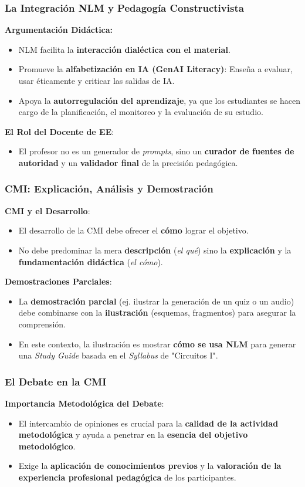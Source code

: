\documentclass[aspectratio=43]{beamer}
\begin{document}
\begin{frame}
\frametitle{ La Integración NLM y Pedagogía Constructivista}

\textbf{Argumentación Didáctica:}
\begin{itemize}
    \item NLM facilita la \textbf{interacción dialéctica con el material}.
    \item Promueve la \textbf{alfabetización en IA (GenAI Literacy)}: Enseña a evaluar, usar éticamente y criticar las salidas de IA.
    \item Apoya la \textbf{autorregulación del aprendizaje}, ya que los estudiantes se hacen cargo de la planificación, el monitoreo y la evaluación de su estudio.
\end{itemize}
\vfill
\textbf{El Rol del Docente de EE}:
\begin{itemize}
    \item El profesor no es un generador de \textit{prompts}, sino un \textbf{curador de fuentes de autoridad} y un \textbf{validador final} de la precisión pedagógica.
\end{itemize}
\end{frame}

\begin{frame}
\frametitle{ CMI: Explicación, Análisis y Demostración}

\textbf{CMI y el Desarrollo}:
\begin{itemize}
    \item El desarrollo de la CMI debe ofrecer el \textbf{cómo} lograr el objetivo.
    \item No debe predominar la mera \textbf{descripción} (\textit{el qué}) sino la \textbf{explicación} y la \textbf{fundamentación didáctica} (\textit{el cómo}).
\end{itemize}

\vfill
\textbf{Demostraciones Parciales}:
\begin{itemize}
    \item La \textbf{demostración parcial} (ej. ilustrar la generación de un quiz o un audio) debe combinarse con la \textbf{ilustración} (esquemas, fragmentos) para asegurar la comprensión.
    \item En este contexto, la ilustración es mostrar \textbf{cómo se usa NLM} para generar una \textit{Study Guide} basada en el \textit{Syllabus} de "Circuitos I".
\end{itemize}
\end{frame}

\begin{frame}
\frametitle{ El Debate en la CMI}

\textbf{Importancia Metodológica del Debate}:
\begin{itemize}
    \item El intercambio de opiniones es crucial para la \textbf{calidad de la actividad metodológica} y ayuda a penetrar en la \textbf{esencia del objetivo metodológico}.
    \item Exige la \textbf{aplicación de conocimientos previos} y la \textbf{valoración de la experiencia profesional pedagógica} de los participantes.
\end{itemize}
\end{frame}
\end{document}
